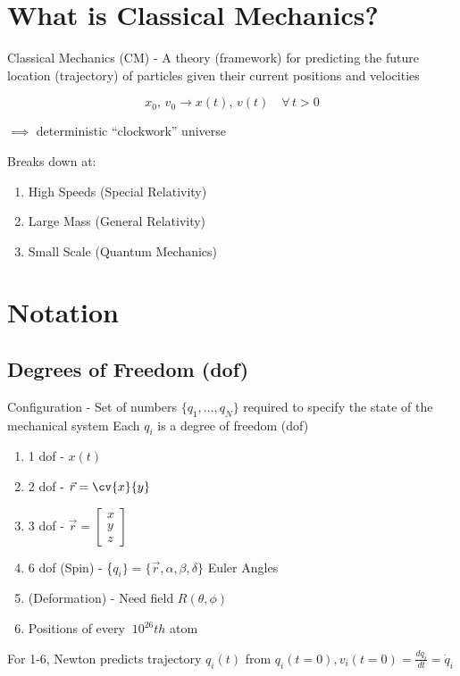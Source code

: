 \documentclass{notes}
\begin{document}
\section{What is Classical Mechanics?}

Classical Mechanics (CM) - A theory (framework) for predicting the future location (trajectory) of particles given their current positions and velocities

\[x_0, \,v_0 \rightarrow x(t), \,v(t) \quad \forall \, t>0\]
\centerline{\(\implies\) deterministic ``clockwork'' universe}
\vspace*{10px}

Breaks down at:
\begin{enumerate}
    \item High Speeds (Special Relativity)
    \item Large Mass (General Relativity)
    \item Small Scale (Quantum Mechanics)
\end{enumerate}

\section{Notation}
\subsection{Degrees of Freedom (dof)}
Configuration - Set of numbers \(\{q_1, \dots, q_N\}\) required to specify the state of the mechanical system
Each \(q_i\) is a degree of freedom (dof)
\begin{enumerate}
    \item 1 dof - \(x(t)\)
    \item 2 dof - \(\vec{r}=\cv{x}{y}\)
    \item 3 dof - \(\vec{r}= \begin{bmatrix}
              x \\ y \\ z
          \end{bmatrix}\)
    \item 6 dof (Spin) - \{\(q_i\}=\{\vec{r}, \alpha, \beta, \delta\}\) Euler Angles
    \item (Deformation) - Need field \(R(\theta, \phi)\)
    \item Positions of every \(~10^{26}th\) atom
\end{enumerate}

For 1-6, Newton predicts trajectory \(q_i(t)\) from \(q_i(t=0), v_i(t=0)=\frac{dq_i}{dt}=\dot{q}_i\)
\end{document}
